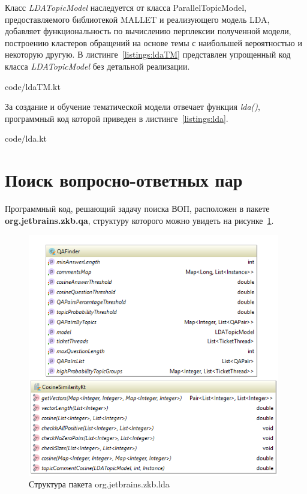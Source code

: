 Класс \textit{LDATopicModel} наследуется от класса ParallelTopicModel, предоставляемого библиотекой MALLET и реализующего модель LDA, добавляет функциональность по вычислению перплексии полученной модели, построению кластеров обращений на основе темы с наибольшей вероятностью и некоторую другую. В листинге~\ref{listings:ldaTM} представлен упрощенный код класса \textit{LDATopicModel} без детальной реализации.


{code/ldaTM.kt}

За создание и обучение тематической модели отвечает функция \textit{lda()}, программный код которой приведен в листинге~\ref{listings:lda}.


{code/lda.kt}

\section{Поиск вопросно-ответных пар}
Программный код, решающий задачу поиска ВОП, расположен в пакете \textbf{org.jetbrains.zkb.qa}, структуру которого можно увидеть на рисунке~\ref{fig:qapck}.

\begin{figure}[tph!]
\centerline{\includegraphics[width=11cm]{fig/qapck.png}}
    \caption{Структура пакета org.jetbrains.zkb.lda}
    \label{fig:qapck}
\end{figure}

